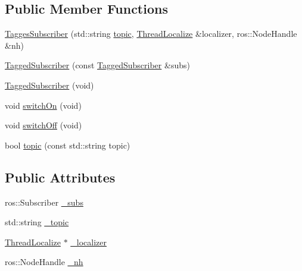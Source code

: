 \subsection*{Public Member Functions}
\begin{DoxyCompactItemize}
\item 
\hyperlink{structohm__tsd__slam__ref_1_1TaggedSubscriber_aa27ec1bb6608bfa803165eb92bf46135}{Tagges\-Subscriber} (std\-::string \hyperlink{structohm__tsd__slam__ref_1_1TaggedSubscriber_a6d4ad13158333a16725cdc1cdd6ab3c2}{topic}, \hyperlink{classohm__tsd__slam__ref_1_1ThreadLocalize}{Thread\-Localize} \&localizer, ros\-::\-Node\-Handle \&nh)
\item 
\hyperlink{structohm__tsd__slam__ref_1_1TaggedSubscriber_aac3521e675e9be4b0d68b96fb7782060}{Tagged\-Subscriber} (const \hyperlink{structohm__tsd__slam__ref_1_1TaggedSubscriber}{Tagged\-Subscriber} \&subs)
\item 
\hyperlink{structohm__tsd__slam__ref_1_1TaggedSubscriber_af58c6641892429bd5d21bdcc5f8f373a}{Tagged\-Subscriber} (void)
\item 
void \hyperlink{structohm__tsd__slam__ref_1_1TaggedSubscriber_a6d95060dc96fb1069588d681668e1420}{switch\-On} (void)
\item 
void \hyperlink{structohm__tsd__slam__ref_1_1TaggedSubscriber_ac41328ef3bb26e0f000f12c989aaf849}{switch\-Off} (void)
\item 
bool \hyperlink{structohm__tsd__slam__ref_1_1TaggedSubscriber_a6d4ad13158333a16725cdc1cdd6ab3c2}{topic} (const std\-::string topic)
\end{DoxyCompactItemize}
\subsection*{Public Attributes}
\begin{DoxyCompactItemize}
\item 
ros\-::\-Subscriber \hyperlink{structohm__tsd__slam__ref_1_1TaggedSubscriber_a61345fb4c4b4e617dfffe70b5b1bd60c}{\-\_\-subs}
\item 
std\-::string \hyperlink{structohm__tsd__slam__ref_1_1TaggedSubscriber_a768a784062a20f2e9a11a1b528c11605}{\-\_\-topic}
\item 
\hyperlink{classohm__tsd__slam__ref_1_1ThreadLocalize}{Thread\-Localize} $\ast$ \hyperlink{structohm__tsd__slam__ref_1_1TaggedSubscriber_afe33f4a8274392173ea2a4ff05f49bc4}{\-\_\-localizer}
\item 
ros\-::\-Node\-Handle \hyperlink{structohm__tsd__slam__ref_1_1TaggedSubscriber_a0ff0c67d13bf2c9c606c25ffa24db8df}{\-\_\-nh}
\end{DoxyCompactItemize}


